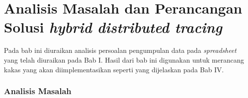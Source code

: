 \chapter{Analisis Masalah dan Perancangan Solusi \textit{hybrid distributed tracing}}

Pada bab ini diuraikan analisis persoalan pengumpulan data pada \textit{spreadsheet} yang telah diuraikan pada Bab I. Hasil dari bab ini digunakan untuk merancang kakas yang akan diimplementasikan seperti yang dijelaskan pada Bab IV.


\subsection{Analisis Masalah}